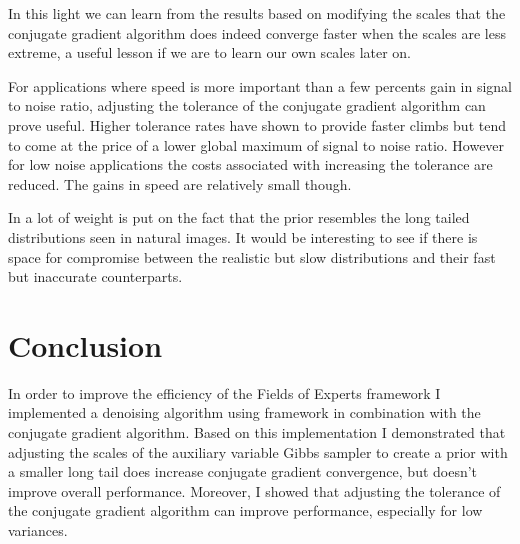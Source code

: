 \documentclass{article}
\begin{document}
In this light we can learn from the results based on modifying the 
scales that the conjugate gradient algorithm does indeed converge faster 
when the scales are less extreme, a useful lesson if we are to learn our 
own scales later on.  

For applications where speed is more important than a few percents gain 
in signal to noise ratio, adjusting the tolerance of the conjugate 
gradient algorithm can prove useful. Higher tolerance rates have shown 
to provide faster climbs but tend to come at the price of a lower global 
maximum of signal to noise ratio. However for low noise applications the 
costs associated with increasing the tolerance are reduced. The gains in 
speed are relatively small though.

In \citep{uwe} a lot of weight is put on the fact that the prior 
resembles the long tailed distributions seen in natural images. It would 
be interesting to see if there is space for compromise between the 
realistic but slow distributions and their fast but inaccurate 
counterparts.


\section{Conclusion}

In order to improve the efficiency of the Fields of Experts framework I 
implemented a denoising algorithm using framework in combination with 
the conjugate gradient algorithm. Based on this implementation I 
demonstrated that adjusting the scales of the auxiliary variable Gibbs 
sampler to create a prior with a smaller long tail does increase 
conjugate gradient convergence, but doesn't improve overall performance.  
Moreover, I showed that adjusting the tolerance of the conjugate 
gradient algorithm can improve performance, especially for low 
variances.



\end{document}
